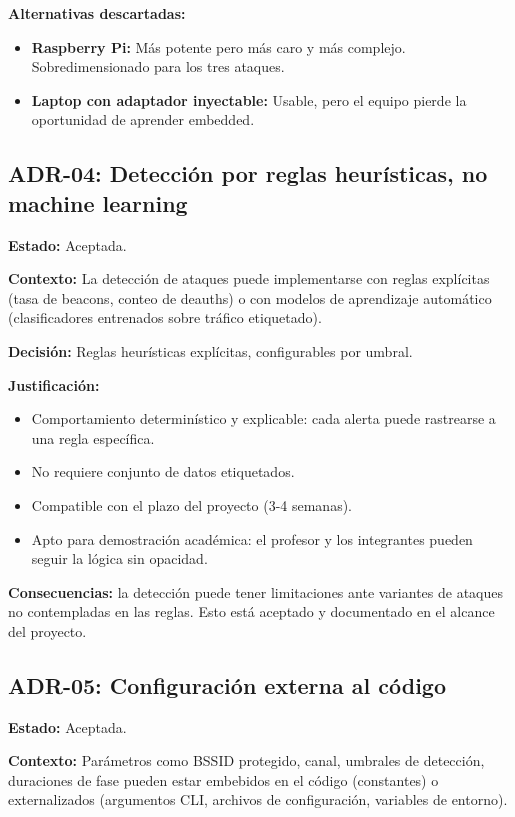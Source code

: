\documentclass[11pt,a4paper]{article}
\begin{document}
\textbf{Alternativas descartadas:}

\begin{itemize}
  \item \textbf{Raspberry Pi:} Más potente pero más caro y más complejo.
    Sobredimensionado para los tres ataques.
  \item \textbf{Laptop con adaptador inyectable:} Usable, pero el equipo
    pierde la oportunidad de aprender embedded.
\end{itemize}

\subsection{ADR-04: Detección por reglas heurísticas, no machine learning}

\textbf{Estado:} Aceptada.

\textbf{Contexto:} La detección de ataques puede implementarse con
reglas explícitas (tasa de beacons, conteo de deauths) o con modelos de
aprendizaje automático (clasificadores entrenados sobre tráfico
etiquetado).

\textbf{Decisión:} Reglas heurísticas explícitas, configurables por
umbral.

\textbf{Justificación:}

\begin{itemize}
  \item Comportamiento determinístico y explicable: cada alerta puede
    rastrearse a una regla específica.
  \item No requiere conjunto de datos etiquetados.
  \item Compatible con el plazo del proyecto (3-4 semanas).
  \item Apto para demostración académica: el profesor y los integrantes
    pueden seguir la lógica sin opacidad.
\end{itemize}

\textbf{Consecuencias:} la detección puede tener limitaciones ante
variantes de ataques no contempladas en las reglas. Esto está aceptado y
documentado en el alcance del proyecto.

\subsection{ADR-05: Configuración externa al código}

\textbf{Estado:} Aceptada.

\textbf{Contexto:} Parámetros como BSSID protegido, canal, umbrales de
detección, duraciones de fase pueden estar embebidos en el código
(constantes) o externalizados (argumentos CLI, archivos de configuración,
variables de entorno).
\end{document}

